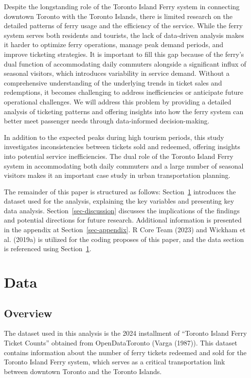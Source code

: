 \documentclass[
  letterpaper,
  DIV=11,
  numbers=noendperiod]{scrartcl}
\begin{document}
Despite the longstanding role of the Toronto Island Ferry system in
connecting downtown Toronto with the Toronto Islands, there is limited
research on the detailed patterns of ferry usage and the efficiency of
the service. While the ferry system serves both residents and tourists,
the lack of data-driven analysis makes it harder to optimize ferry
operations, manage peak demand periods, and improve ticketing
strategies. It is important to fill this gap because of the ferry's dual
function of accommodating daily commuters alongside a significant influx
of seasonal visitors, which introduces variability in service demand.
Without a comprehensive understanding of the underlying trends in ticket
sales and redemptions, it becomes challenging to address inefficiencies
or anticipate future operational challenges. We will address this
problem by providing a detailed analysis of ticketing patterns and
offering insights into how the ferry system can better meet passenger
needs through data-informed decision-making.

In addition to the expected peaks during high tourism periods, this
study investigates inconsistencies between tickets sold and redeemed,
offering insights into potential service inefficiencies. The dual role
of the Toronto Island Ferry system in accommodating both daily commuters
and a large number of seasonal visitors makes it an important case study
in urban transportation planning.

The remainder of this paper is structured as follows:
Section~\ref{sec-data} introduces the dataset used for the analysis,
explaining the key variables and presenting key data analysis.
Section~\ref{sec-discussion} discusses the implications of the findings
and potential directions for future research. Additional information is
presented in the appendix at Section~\ref{sec-appendix}. R Core Team
(2023) and Wickham et al. (2019a) is utilized for the coding proposes of
this paper, and the data section is referenced using
Section~\ref{sec-data}.

\section{Data}\label{sec-data}

\subsection{Overview}\label{sec-data-overview}

The dataset used in this analysis is the 2024 installment of ``Toronto
Island Ferry Ticket Counts'' obtained from OpenDataToronto (Varga
(1987)). This dataset contains information about the number of ferry
tickets redeemed and sold for the Toronto Island Ferry system, which
serves as a critical transportation link between downtown Toronto and
the Toronto Islands.
\end{document}
